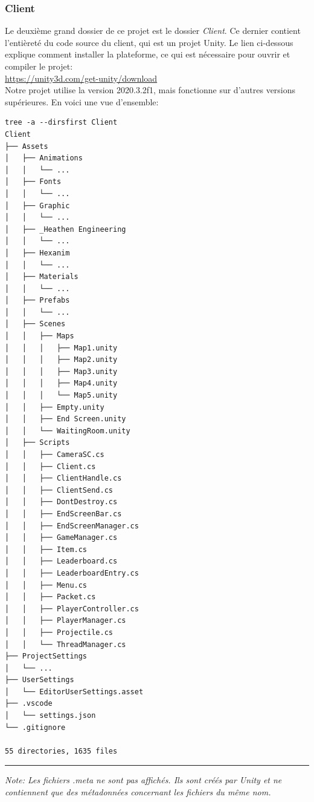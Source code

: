 \documentclass[a4paper]{article}
\begin{document}
\subsubsection{Client}
Le deuxième grand dossier de ce projet est le dossier \emph{Client}. Ce dernier contient l'entièreté du code source du client, qui est un projet Unity. Le lien ci-dessous explique comment installer la plateforme, ce qui est nécessaire pour ouvrir et compiler le projet: \\
\url{https://unity3d.com/get-unity/download} \\
Notre projet utilise la version 2020.3.2f1, mais fonctionne sur d'autres versions supérieures.
En voici une vue d'ensemble:
\begin{verbatim}
tree -a --dirsfirst Client
Client
├── Assets
│   ├── Animations
│   │   └── ...
│   ├── Fonts
│   │   └── ...
│   ├── Graphic
│   │   └── ...
│   ├── _Heathen Engineering
│   │   └── ...
│   ├── Hexanim
│   │   └── ...
│   ├── Materials
│   │   └── ...
│   ├── Prefabs
│   │   └── ...
│   ├── Scenes
│   │   ├── Maps
│   │   │   ├── Map1.unity
│   │   │   ├── Map2.unity
│   │   │   ├── Map3.unity
│   │   │   ├── Map4.unity
│   │   │   └── Map5.unity
│   │   ├── Empty.unity
│   │   ├── End Screen.unity
│   │   └── WaitingRoom.unity
│   ├── Scripts
│   │   ├── CameraSC.cs
│   │   ├── Client.cs
│   │   ├── ClientHandle.cs
│   │   ├── ClientSend.cs
│   │   ├── DontDestroy.cs
│   │   ├── EndScreenBar.cs
│   │   ├── EndScreenManager.cs
│   │   ├── GameManager.cs
│   │   ├── Item.cs
│   │   ├── Leaderboard.cs
│   │   ├── LeaderboardEntry.cs
│   │   ├── Menu.cs
│   │   ├── Packet.cs
│   │   ├── PlayerController.cs
│   │   ├── PlayerManager.cs
│   │   ├── Projectile.cs
│   │   └── ThreadManager.cs
├── ProjectSettings
│   └── ...
├── UserSettings
│   └── EditorUserSettings.asset
├── .vscode
│   └── settings.json
└── .gitignore
 
55 directories, 1635 files
\end{verbatim}
\hrule
\textit{Note: Les fichiers .meta ne sont pas affichés. Ils sont créés par Unity et ne contiennent que des métadonnées concernant les fichiers du même nom.} \\
\end{document}
